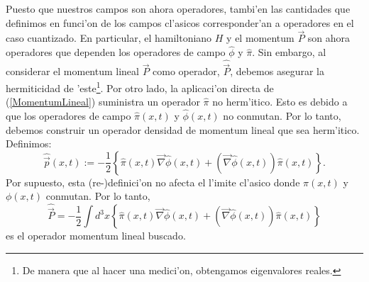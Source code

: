 Puesto que nuestros campos son ahora operadores, tambi'en las cantidades que
definimos en funci'on de los campos cl'asicos corresponder'an a operadores en el
caso cuantizado. En particular, el hamiltoniano $H$ y el momentum $\vec{P}$ son
ahora operadores que dependen los operadores de campo $\hat{\phi}$ y
$\hat{\pi}$. Sin embargo, al considerar el momentum lineal $\vec{P}$ como
operador, $\hat{\vec{P}}$, debemos asegurar la
hermiticidad de 'este\footnote{De manera que al hacer una medici'on, obtengamos
eigenvalores reales.}. Por otro lado, la aplicaci'on directa de
(\ref{MomentumLineal}) suministra un operador $\hat{\pi}$
no herm'itico. Esto es debido a que los operadores de campo $\hat{\pi}(x,t)$
y $\hat{\phi}(x,t) $ no conmutan. Por lo tanto, debemos construir un operador
densidad de momentum lineal que sea herm'itico. Definimos:
\begin{equation}
\hat{\vec{p}}(x,t) :=-\frac{1}{2}\left\{ \hat{\pi}(x,t)
\vec{\nabla}\hat{\phi}(x,t)+\left(
\vec{\nabla}\hat{\phi}(x,t)\right)\hat{\pi}(x,t)\right\}.
\label{OperadorDensMomentumLineal}
\end{equation}
Por supuesto, esta (re-)definici'on no afecta el l'imite cl'asico donde
$\pi(x,t)$
y $\phi(x,t) $ conmutan. Por lo tanto,
\begin{equation}
\hat{\vec{P}}=-\frac{1}{2}\int d^{3}x\left\{ \hat{\pi}(x,t)
\vec{\nabla}\hat{\phi}(x,t) +\left( \vec{\nabla}\hat{\phi}(x,t)\right)
\hat{\pi}(x,t)
\right\} \label{OperadorMomentumLineal}
\end{equation}
es el operador momentum lineal buscado.

